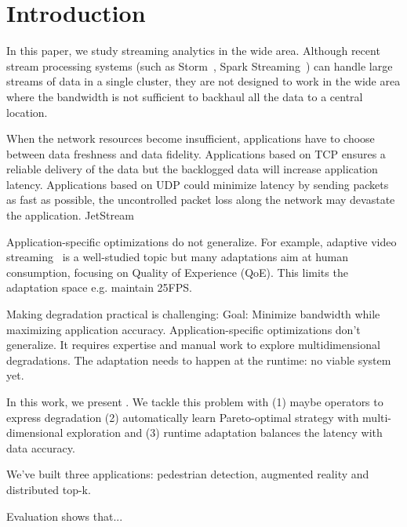 \section{Introduction}

In this paper, we study streaming analytics in the wide area. Although recent
stream processing systems (such as Storm~\cite{toshniwal2014storm}, Spark
Streaming~\cite{zaharia2013discretized}) can handle large streams of data in a
single cluster, they are not designed to work in the wide area where the
bandwidth is not sufficient to backhaul all the data to a central location.


When the network resources become insufficient, applications have to choose
between data freshness and data fidelity. Applications based on TCP ensures a
reliable delivery of the data but the backlogged data will increase application
latency. Applications based on UDP could minimize latency by sending packets as
fast as possible, the uncontrolled packet loss along the network may devastate
the application. JetStream~\cite{rabkin2014aggregation}

Application-specific optimizations do not generalize. For example, adaptive
video streaming~\cite{yin2015control} is a well-studied topic but many
adaptations aim at human consumption, focusing on Quality of Experience
(QoE). This limits the adaptation space e.g. maintain 25FPS.

Making degradation practical is challenging: Goal: Minimize bandwidth while
maximizing application accuracy. Application-specific optimizations don't
generalize. It requires expertise and manual work to explore multidimensional
degradations. The adaptation needs to happen at the runtime: no viable system
yet.

In this work, we present \sysname{}. We tackle this problem with (1) maybe
operators to express degradation (2) automatically learn Pareto-optimal strategy
with multi-dimensional exploration and (3) runtime adaptation balances the
latency with data accuracy.

We've built three applications: pedestrian detection, augmented reality and
distributed top-k.

Evaluation shows that...


